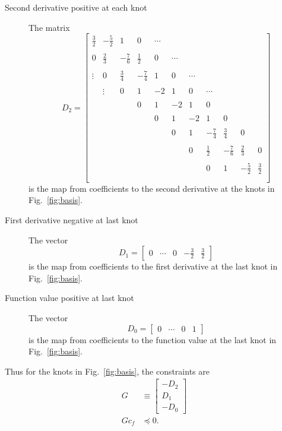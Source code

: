 \documentclass[11pt]{article}
\newcommand\cf{c_f}
\begin{document}
\begin{description}
\item[Second derivative positive at each knot] The matrix
  \setcounter{MaxMatrixCols}{12}
  \begin{equation}
    \label{eq:d2}
    D_2 =
    \begin{bmatrix}
      \frac{3}{2} & -\frac{5}{2} & 1     & 0   & \cdots \\ \\
      0   & \frac{2}{3} & -\frac{7}{6} & \frac{1}{2} & 0 & \cdots \\ \\
      \vdots   & 0    & \frac{3}{4} & -\frac{7}{4} & 1 & 0 & \cdots \\ \\
      & \vdots    & 0   & 1 & -2 & 1 & 0 & \cdots \\ \\
       & & & 0 & 1 & -2 & 1 & 0  \\ \\
      & & & & 0 & 1 & -2 & 1 & 0  \\ \\
      &&&&& 0 & 1 & -\frac{7}{4} &\frac{3}{4} & 0 \\ \\
      &&&&&& 0 & \frac{1}{2} & -\frac{7}{6} & \frac{2}{3} & 0 \\ \\
      &&&&&&& 0 & 1 & -\frac{5}{2} & \frac{3}{2} \\ \\
    \end{bmatrix}
  \end{equation}
  is the map from coefficients to the second derivative at the knots
  in Fig.~\ref{fig:basis}.
\item[First derivative negative at last knot] The vector
  \begin{equation*}
    D_1 = \begin{bmatrix}
    0 & \cdots & 0 & -\frac{3}{2} & \frac{3}{2}
  \end{bmatrix}
  \end{equation*}
  is the map from coefficients to the first derivative at the last knot
  in Fig.~\ref{fig:basis}.
\item[Function value positive at last knot] The vector
  \begin{equation*}
     D_0 = \begin{bmatrix}
    0 & \cdots & 0 & 1
  \end{bmatrix}
  \end{equation*}
  is the map from coefficients to the function value at the last knot
  in Fig.~\ref{fig:basis}.
\end{description}
Thus for the knots in Fig.~\ref{fig:basis}, the constraints are
\begin{align}
  G & \equiv
      \begin{bmatrix}
        - D_2 \\ D_1 \\ -D_0
      \end{bmatrix}\\
  \label{eq:constraint}
  G\cf & \preceq 0.
\end{align}
\end{document}

